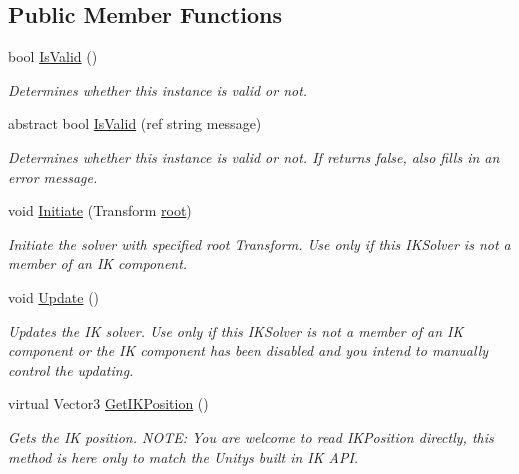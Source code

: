 \subsection*{Public Member Functions}
\begin{DoxyCompactItemize}
\item 
bool \mbox{\hyperlink{class_root_motion_1_1_final_i_k_1_1_i_k_solver_a05cf2b47406dab8d7c9003d3e43c0abe}{Is\+Valid}} ()
\begin{DoxyCompactList}\small\item\em Determines whether this instance is valid or not. \end{DoxyCompactList}\item 
abstract bool \mbox{\hyperlink{class_root_motion_1_1_final_i_k_1_1_i_k_solver_a6ccc7496e7f4e95668e1c1bdaa051d67}{Is\+Valid}} (ref string message)
\begin{DoxyCompactList}\small\item\em Determines whether this instance is valid or not. If returns false, also fills in an error message. \end{DoxyCompactList}\item 
void \mbox{\hyperlink{class_root_motion_1_1_final_i_k_1_1_i_k_solver_a6d14097828db1e3b401eaa6ee4dd153e}{Initiate}} (Transform \mbox{\hyperlink{class_root_motion_1_1_final_i_k_1_1_i_k_solver_add558b38f163259934c37a0f1b497c06}{root}})
\begin{DoxyCompactList}\small\item\em Initiate the solver with specified root Transform. Use only if this I\+K\+Solver is not a member of an IK component. \end{DoxyCompactList}\item 
void \mbox{\hyperlink{class_root_motion_1_1_final_i_k_1_1_i_k_solver_a5d346bbf9eb40d4282bc84befe635edc}{Update}} ()
\begin{DoxyCompactList}\small\item\em Updates the IK solver. Use only if this I\+K\+Solver is not a member of an IK component or the IK component has been disabled and you intend to manually control the updating. \end{DoxyCompactList}\item 
virtual Vector3 \mbox{\hyperlink{class_root_motion_1_1_final_i_k_1_1_i_k_solver_aed08007156944c206abc59fa8da029ab}{Get\+I\+K\+Position}} ()
\begin{DoxyCompactList}\small\item\em Gets the IK position. N\+O\+TE\+: You are welcome to read I\+K\+Position directly, this method is here only to match the Unity\textquotesingle{}s built in IK A\+PI. \end{DoxyCompactList}\item 

\end{DoxyCompactItemize}
